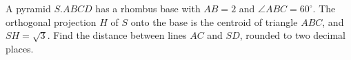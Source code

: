 A pyramid $S.ABCD$ has a rhombus base with $AB=2$ and $\angle ABC=60^\circ$. The orthogonal projection $H$ of $S$ onto the base is the centroid of triangle $ABC$, and $SH=\sqrt3$. Find the distance between lines $AC$ and $SD$, rounded to two decimal places.
